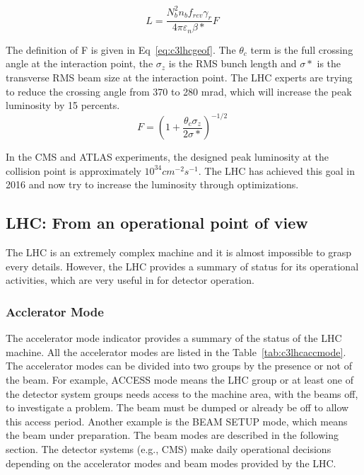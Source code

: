\begin{equation}
 L = \frac{N^{2}_{b}n_{b}f_{rev}\gamma_{r}}{4\pi \varepsilon_{n}\beta *}F \;
 \label{eq:c3lhclumi}
\end{equation}

The definition of F is given in Eq~\ref{eq:c3lhcgeof}. The $\theta_{c}$ term is the full crossing angle at the interaction point, the $\sigma_{z}$ is the RMS bunch length and $\sigma *$ is the transverse RMS beam size at the interaction point. The LHC experts are trying to reduce the crossing angle from 370 to 280 mrad, which will increase the peak luminosity by 15 percents. 
\begin{equation}
 F = (1+\frac{\theta_{c}\sigma_{z}}{2\sigma *})^{-1/2} \;
 \label{eq:c3lhcgeof}
\end{equation}

In the CMS and ATLAS experiments, the designed peak luminosity at the collision point is approximately $10^{34}cm^{-2}s^{-1}$. The LHC has achieved this goal in 2016 and now try to increase the luminosity through optimizations.

\clearpage
\subsection{LHC: From an operational point of view}

The LHC is an extremely complex machine and it is almost impossible to grasp every details. However, the LHC provides a summary of status for its operational activities, which are very useful in for detector operation.

\subsubsection{Acclerator Mode}

The accelerator mode indicator provides a summary of the status of the LHC machine. All the accelerator modes are listed in the Table~\ref{tab:c3lhcaccmode}. The accelerator modes can be divided into two groups by the presence or not of the beam. For example, ACCESS mode means the LHC group or at least one of the detector system groups needs access to the machine area, with the beams off, to investigate a problem. The beam must be dumped or already be off to allow this access period. Another example is the BEAM SETUP mode, which means the beam under preparation. The beam modes are described in the following section. The detector systems (e.g., CMS) make daily operational decisions depending on the accelerator modes and beam modes provided by the LHC.

